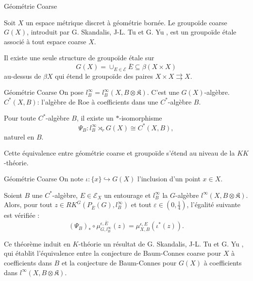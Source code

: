 \begin{frame}{Géométrie Coarse}

Soit $X$ un espace métrique discret à géométrie bornée. Le groupoïde coarse $G(X)$, introduit par G. Skandalis, J-L. Tu et G. Yu \cite{SkTuYu}, est un groupoïde étale associé à tout espace coarse $X$.\\
\vspace{0.3 cm}
\begin{definitionfr}
Il existe une seule structure de groupoïde étale sur 
\[G(X) = \cup_{E\in\mathcal E }\overline{E}\subseteq \beta (X\times X)\]
au-dessus de $\beta X$ qui étend le groupoïde des paires $X\times X\rightrightarrows X$.
\end{definitionfr} 

\end{frame}

\begin{frame}{Géométrie Coarse}
On pose $l_B^\infty = l_B^\infty(X,B\otimes \mathfrak K)$. C'est une $G(X)$-algèbre.\\
\vspace{0.3 cm}
$C^*(X,B)$: l'algèbre de Roe à coefficients dans une $C^*$-algèbre $B$.\\
\vspace{0.3 cm}
\begin{propfr}
Pour toute $C^*$-algèbre $B$, il existe un $*$-isomorphisme 
\[\Psi_B : l_B^\infty \rtimes_r G(X) \cong C^*(X,B) ,\]
naturel en $B$.
\end{propfr} 
\vspace{0.3 cm}
Cette équivalence entre géométrie coarse et groupoïde s'étend au niveau de la $KK$-théorie.
\end{frame}


\begin{frame}{Géométrie Coarse}
On note $\iota : \{x\}\hookrightarrow G(X)$ l'inclusion d'un point $x\in X$.\\
\vspace{0.3 cm}
\begin{thmfr}
Soient $B$ une $C^*$-algèbre, $E\in\mathcal E_X$ un entourage et $l_B^\infty$ la $G$-algèbre $l^\infty(X,B\otimes \mathfrak K)$. Alors, pour tout $z\in RK^G(P_{\overline E}(G),l_B^\infty)$ et tout $\varepsilon\in(0,\frac{1}{4})$, l'égalité suivante est vérifiée :
\[(\Psi_B)_*\circ\mu^{\epsilon,\overline E}_{G,l_B^\infty} (z) = \mu_{X,B}^{\epsilon,E}(\iota^*(z)).\]
\end{thmfr}
\vspace{0.3 cm}
Ce théorème induit en $K$-théorie un résultat de G. Skandalis, J-L. Tu et G. Yu \cite{SkTuYu}, qui établit l'équivalence entre la conjecture de Baum-Connes coarse pour $X$ à coefficients dans $B$ et la conjecture de Baum-Connes pour $G(X)$ à coefficients dans $l^\infty(X,B\otimes \mathfrak K)$.
\end{frame}

